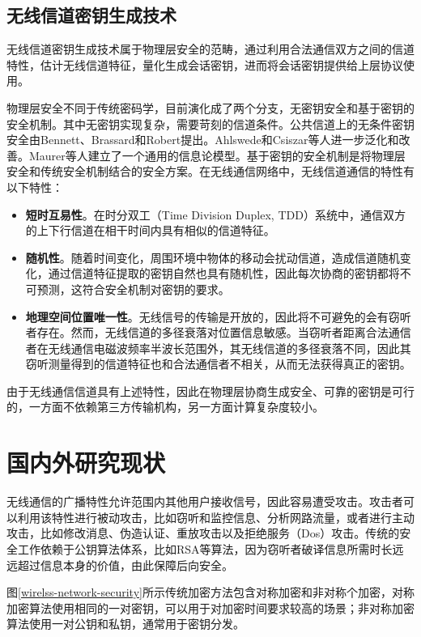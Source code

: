 \documentclass[master]{seuthesis} %
\begin{document}
\begin{Main}
\subsection{无线信道密钥生成技术}

无线信道密钥生成技术属于物理层安全的范畴，通过利用合法通信双方之间的信道特性，估计无线信道特征，量化生成会话密钥，进而将会话密钥提供给上层协议使用。

物理层安全不同于传统密码学，目前演化成了两个分支，无密钥安全和基于密钥的安全机制。其中无密钥实现复杂，需要苛刻的信道条件。公共信道上的无条件密钥安全由Bennett、Brassard和Robert提出\cite{bennett1985reduce}\cite{bennett1988privacy}。Ahlswede和Csiszar等人进一步泛化和改善\cite{ahlswede1993common}。Maurer等人建立了一个通用的信息论模型\cite{maurer1993secret}。基于密钥的安全机制是将物理层安全和传统安全机制结合的安全方案。在无线通信网络中，无线信道通信的特性有以下特性：

\begin{itemize}
    \item \textbf{短时互易性}。在时分双工（Time Division Duplex, TDD）系统中，通信双方的上下行信道在相干时间内具有相似的信道特征。
    \item \textbf{随机性}。随着时间变化，周围环境中物体的移动会扰动信道，造成信道随机变化，通过信道特征提取的密钥自然也具有随机性，因此每次协商的密钥都将不可预测，这符合安全机制对密钥的要求。
    \item \textbf{地理空间位置唯一性}。无线信号的传输是开放的，因此将不可避免的会有窃听者存在。然而，无线信道的多径衰落对位置信息敏感。当窃听者距离合法通信者在无线通信电磁波频率半波长范围外，其无线信道的多径衰落不同，因此其窃听测量得到的信道特征也和合法通信者不相关，从而无法获得真正的密钥。
\end{itemize}

由于无线通信信道具有上述特性，因此在物理层协商生成安全、可靠的密钥是可行的，一方面不依赖第三方传输机构，另一方面计算复杂度较小。

\section{国内外研究现状}

无线通信的广播特性允许范围内其他用户接收信号，因此容易遭受攻击。攻击者可以利用该特性进行被动攻击，比如窃听和监控信息、分析网路流量，或者进行主动攻击，比如修改消息、伪造认证、重放攻击以及拒绝服务（Dos）攻击\cite{Zhang2016Key}。传统的安全工作依赖于公钥算法体系，比如RSA等算法，因为窃听者破译信息所需时长远远超过信息本身的价值，由此保障后向安全。

图\ref{wirelss-network-security}所示传统加密方法包含对称加密和非对称个加密，对称加密算法使用相同的一对密钥，可以用于对加密时间要求较高的场景；非对称加密算法使用一对公钥和私钥，通常用于密钥分发。


\end{Main}
\end{document}

